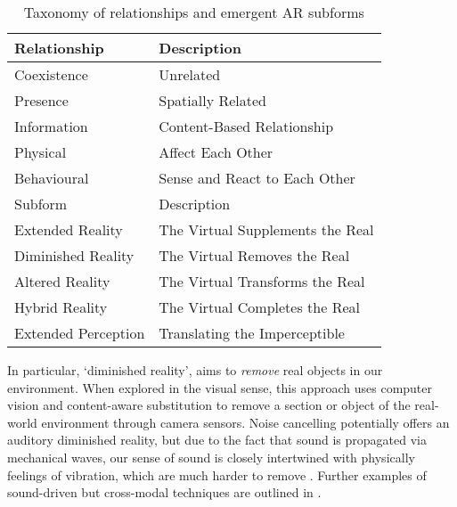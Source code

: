 \begin{table}[ht]
    \centering
    \begin{tabular}{ l l }
        \toprule
        Relationship        & Description                       \\
        \midrule
        Coexistence         & Unrelated                         \\
        Presence            & Spatially Related                 \\
        Information         & Content-Based Relationship        \\
        Physical            & Affect Each Other                 \\
        Behavioural         & Sense and React to Each Other     \\
        \midrule
        \midrule
        Subform             & Description                       \\
        \midrule
        Extended Reality    & The Virtual Supplements the Real  \\
        Diminished Reality  & The Virtual Removes the Real      \\
        Altered Reality     & The Virtual Transforms the Real   \\
        Hybrid Reality      & The Virtual Completes the Real    \\
        Extended Perception & Translating the Imperceptible     \\
        \bottomrule
    \end{tabular}
    \captionsetup{justification=centering,margin=1.5cm}
    \caption{Taxonomy of relationships and emergent AR subforms \citep[in][]{schraffenberger2018}}\label{table:schraffenbergertaxonomy}
\end{table}

In particular, `diminished reality', aims to \textit{remove} real objects in our environment. When explored in the visual sense, this approach uses computer vision and content-aware substitution to remove a section or object of the real-world environment through camera sensors. Noise cancelling potentially offers an auditory diminished reality, but due to the fact that sound is propagated via mechanical waves, our sense of sound is closely intertwined with physically feelings of vibration, which are much harder to remove \citep{mori2017}. Further examples of sound-driven but cross-modal techniques are outlined in \citep{walther-hansen2020}.

